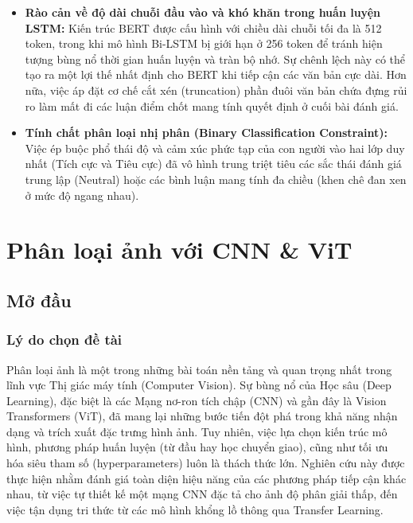 \documentclass[a4paper]{article}
\theoremstyle{definition}
\begin{document}
\begin{itemize}
	\item \textbf{Rào cản về độ dài chuỗi đầu vào và khó khăn trong huấn luyện LSTM:} Kiến trúc BERT được cấu hình với chiều dài chuỗi tối đa là 512 token, trong khi mô hình Bi-LSTM bị giới hạn ở 256 token để tránh hiện tượng bùng nổ thời gian huấn luyện và tràn bộ nhớ. Sự chênh lệch này có thể tạo ra một lợi thế nhất định cho BERT khi tiếp cận các văn bản cực dài. Hơn nữa, việc áp đặt cơ chế cắt xén (truncation) phần đuôi văn bản chứa đựng rủi ro làm mất đi các luận điểm chốt mang tính quyết định ở cuối bài đánh giá.
	\item \textbf{Tính chất phân loại nhị phân (Binary Classification Constraint):} Việc ép buộc phổ thái độ và cảm xúc phức tạp của con người vào hai lớp duy nhất (Tích cực và Tiêu cực) đã vô hình trung triệt tiêu các sắc thái đánh giá trung lập (Neutral) hoặc các bình luận mang tính đa chiều (khen chê đan xen ở mức độ ngang nhau).
\end{itemize}

\section{Phân loại ảnh với CNN \& ViT}

\subsection{Mở đầu}

\subsubsection{Lý do chọn đề tài}
Phân loại ảnh là một trong những bài toán nền tảng và quan trọng nhất trong lĩnh vực Thị giác máy tính (Computer Vision). Sự bùng nổ của Học sâu (Deep Learning), đặc biệt là các Mạng nơ-ron tích chập (CNN) và gần đây là Vision Transformers (ViT), đã mang lại những bước tiến đột phá trong khả năng nhận dạng và trích xuất đặc trưng hình ảnh. Tuy nhiên, việc lựa chọn kiến trúc mô hình, phương pháp huấn luyện (từ đầu hay học chuyển giao), cũng như tối ưu hóa siêu tham số (hyperparameters) luôn là thách thức lớn. Nghiên cứu này được thực hiện nhằm đánh giá toàn diện hiệu năng của các phương pháp tiếp cận khác nhau, từ việc tự thiết kế một mạng CNN đặc tả cho ảnh độ phân giải thấp, đến việc tận dụng tri thức từ các mô hình khổng lồ thông qua Transfer Learning.
\end{document}

